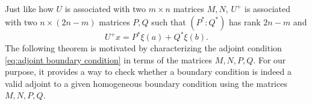 \documentclass[11pt, oneside, a4paper]{article}
\begin{document}
Just like how $U$ is associated with two $m\times n$ matrices $M, N$, $U^+$ is associated with two $n\times (2n-m)$ matrices $P, Q$ such that $(P^*:Q^*)$ has rank $2n-m$ and
\begin{equation}\label{eq:U^+x in P* Q*}
    U^+x = P^*\xi(a) + Q^*\xi(b).
\end{equation}
The following theorem is motivated by characterizing the adjoint condition \eqref{eq:adjoint boundary condition} in terms of the matrices $M, N, P, Q$. For our purpose, it provides a way to check whether a boundary condition is indeed a valid adjoint to a given homogeneous boundary condition using the matrices $M, N, P, Q$.
\end{document}
